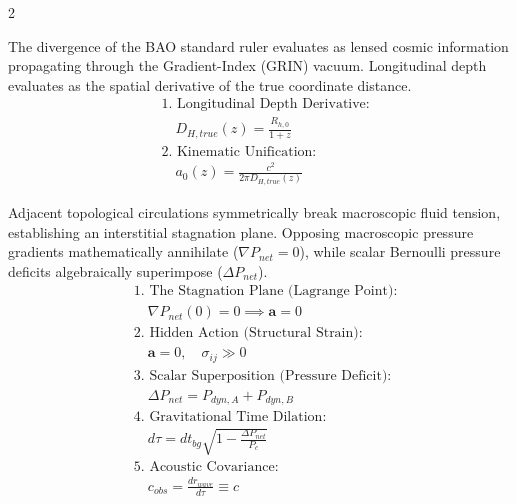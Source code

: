 \documentclass[11pt, a4paper]{article}
\newcounter{cheatnum}
\begin{document}
\begin{multicols}{2}
\begin{tcolorbox}[cheatbox, title={\refstepcounter{cheatnum}\label{box:bao_lensing}\thecheatnum. Baryon Acoustic Oscillations \& Kinematic Unification \scriptsize\hfill\hyperref[sec:deriv_bao_lensing]{[Proof $\downarrow$]}}]
The divergence of the BAO standard ruler evaluates as lensed cosmic information propagating through the Gradient-Index (GRIN) vacuum. Longitudinal depth evaluates as the spatial derivative of the true coordinate distance. 
\begin{align}
    &\text{1. Longitudinal Depth Derivative:} \nonumber \\
    &\quad D_{H,true}(z) = \frac{R_{h,0}}{1+z} \label{eq:bao_longitudinal} \\
    &\text{2. Kinematic Unification:} \nonumber \\
    &\quad a_0(z) = \frac{c^2}{2\pi D_{H,true}(z)} \label{eq:bao_kinematic_unification}
\end{align}
\end{tcolorbox}

\begin{tcolorbox}[cheatbox, title={\refstepcounter{cheatnum}\label{box:auxetic_symmetry_covariance}\thecheatnum. Symmetry Breaking \& Covariance \scriptsize\hfill\hyperref[sec:deriv_auxetic_symmetry_covariance]{[Proof $\downarrow$]}}]
Adjacent topological circulations symmetrically break macroscopic fluid tension, establishing an interstitial stagnation plane. Opposing macroscopic pressure gradients mathematically annihilate ($\nabla P_{net} = 0$), while scalar Bernoulli pressure deficits algebraically superimpose ($\Delta P_{net}$). 
\begin{align}
    &\text{1. The Stagnation Plane (Lagrange Point):} \nonumber \\
    &\quad \nabla P_{net}(0) = 0 \implies \mathbf{a} = 0 \label{eq:gradient_cancellation} \\
    &\text{2. Hidden Action (Structural Strain):} \nonumber \\
    &\quad \mathbf{a} = 0, \quad \sigma_{ij} \gg 0 \label{eq:hidden_action_stress} \\
    &\text{3. Scalar Superposition (Pressure Deficit):} \nonumber \\
    &\quad \Delta P_{net} = P_{dyn,A} + P_{dyn,B} \label{eq:scalar_superposition} \\
    &\text{4. Gravitational Time Dilation:} \nonumber \\
    &\quad d\tau = dt_{bg} \sqrt{1 - \frac{\Delta P_{net}}{P_c}} \label{eq:scalar_time_dilation} \\
    &\text{5. Acoustic Covariance:} \nonumber \\
    &\quad c_{obs} = \frac{dr_{wave}}{d\tau} \equiv c \label{eq:acoustic_covariance}
\end{align}
\end{tcolorbox}


\end{multicols}
\end{document}

